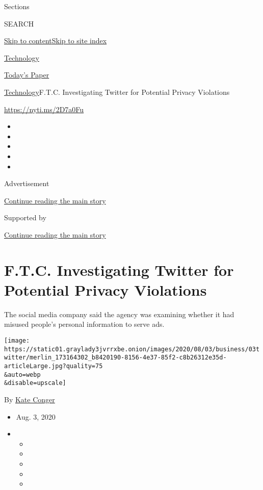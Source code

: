 Sections

SEARCH

\protect\hyperlink{site-content}{Skip to
content}\protect\hyperlink{site-index}{Skip to site index}

\href{https://www.nytimes3xbfgragh.onion/section/technology}{Technology}

\href{https://myaccount.nytimes3xbfgragh.onion/auth/login?response_type=cookie\&client_id=vi}{}

\href{https://www.nytimes3xbfgragh.onion/section/todayspaper}{Today's
Paper}

\href{/section/technology}{Technology}\textbar{}F.T.C. Investigating
Twitter for Potential Privacy Violations

\url{https://nyti.ms/2D7a0Fu}

\begin{itemize}
\item
\item
\item
\item
\item
\end{itemize}

Advertisement

\protect\hyperlink{after-top}{Continue reading the main story}

Supported by

\protect\hyperlink{after-sponsor}{Continue reading the main story}

\hypertarget{ftc-investigating-twitter-for-potential-privacy-violations}{%
\section{F.T.C. Investigating Twitter for Potential Privacy
Violations}\label{ftc-investigating-twitter-for-potential-privacy-violations}}

The social media company said the agency was examining whether it had
misused people's personal information to serve ads.

\texttt{[image: https://static01.graylady3jvrrxbe.onion/images/2020/08/03/business/03twitter/merlin\_173164302\_b8420190-8156-4e37-85f2-c8b26312e35d-articleLarge.jpg?quality=75\\\&auto=webp\\\&disable=upscale]}

By \href{https://www.nytimes3xbfgragh.onion/by/kate-conger}{Kate Conger}

\begin{itemize}
\item
  Aug. 3, 2020
\item
  \begin{itemize}
  \item
  \item
  \item
  \item
  \item
  \end{itemize}
\end{itemize}

